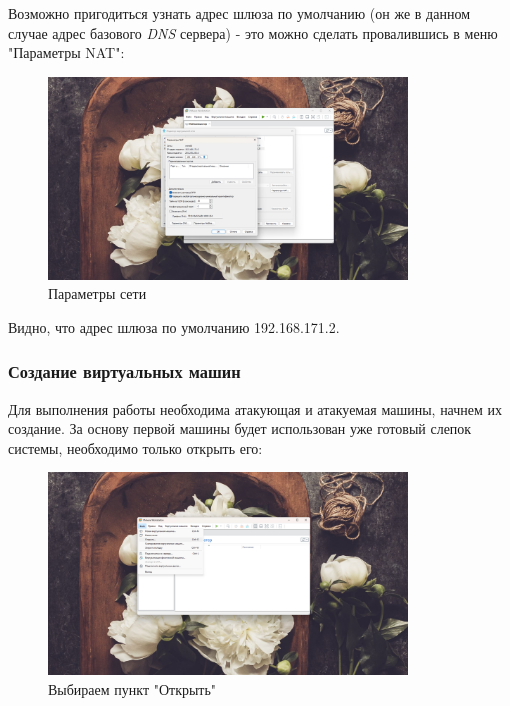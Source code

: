 \documentclass[a4paper]{article}
\begin{document}
  Возможно пригодиться узнать адрес шлюза по умолчанию (он же в данном случае
  адрес базового \textit{DNS} сервера) - это можно сделать провалившись
  в меню "Параметры NAT":

  \begin{figure}[H]
    \centering
    \includegraphics[width=0.85\textwidth]{03_01_00 (2)}
    \caption{Параметры сети}
    \label{img:7}
  \end{figure}

  Видно, что адрес шлюза по умолчанию 192.168.171.2.

  \subsubsection{Создание виртуальных машин}

  Для выполнения работы необходима атакующая и атакуемая машины, начнем их
  создание. За основу первой машины будет использован уже готовый слепок системы,
  необходимо только открыть его:
  
  \begin{figure}[H]
    \centering
    \includegraphics[width=0.85\textwidth]{03_00 (7)}
    \caption{Выбираем пункт "Открыть"}
    \label{img:7_5}
  \end{figure}
\end{document}
